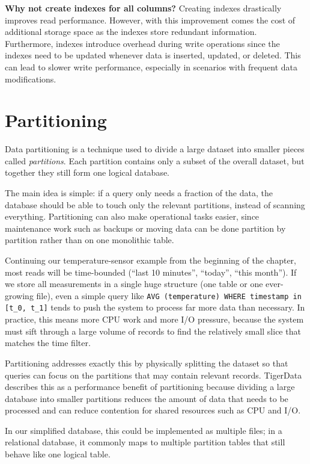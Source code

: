 \textbf{Why not create indexes for all columns?} Creating indexes drastically improves read performance. However, with this improvement comes the cost of additional storage space as the indexes store redundant information. Furthermore, indexes introduce overhead during write operations since the indexes need to be updated whenever data is inserted, updated, or deleted. This can lead to slower write performance, especially in scenarios with frequent data modifications.

\section{Partitioning}

Data partitioning is a technique used to divide a large dataset into smaller
pieces called \textit{partitions}. Each partition contains only a subset of the
overall dataset, but together they still form one logical
database.\cite{TigerData:01}

The main idea is simple: if a query only needs a fraction of the data, the
database should be able to touch only the relevant partitions, instead of
scanning everything. Partitioning can also make operational tasks easier, since
maintenance work such as backups or moving data can be done partition by
partition rather than on one monolithic table.\cite{TigerData:01}

Continuing our temperature-sensor example from the beginning of the chapter,
most reads will be time-bounded (``last 10 minutes'', ``today'', ``this
month''). If we store all measurements in a single huge structure (one table or
one ever-growing file), even a simple query like \texttt{AVG (temperature)
  WHERE timestamp in [t\_0, t\_1]} tends to push the system to process far more
data than necessary. In practice, this means more CPU work and more I/O
pressure, because the system must sift through a large volume of records to
find the relatively small slice that matches the time filter.

Partitioning addresses exactly this by physically splitting the dataset so that
queries can focus on the partitions that may contain relevant records.
TigerData describes this as a performance benefit of partitioning because
dividing a large database into smaller partitions reduces the amount of data
that needs to be processed and can reduce contention for shared resources such
as CPU and I/O.\cite{TigerData:01}

In our simplified database, this could be implemented as multiple files; in a
relational database, it commonly maps to multiple partition tables that still
behave like one logical table.\cite{TigerData:01}

